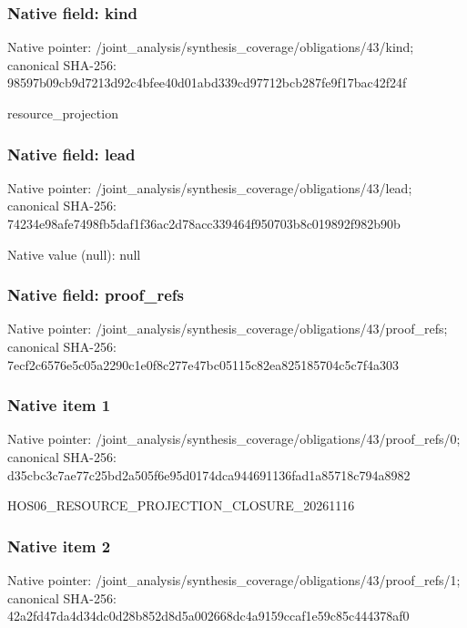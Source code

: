\documentclass[10pt,a4paper]{article}
\begin{document}
\subsubsection{Native field: kind}
Native pointer: /joint\_\allowbreak{}analysis/synthesis\_\allowbreak{}coverage/obligations/43/kind; canonical SHA-256: 98597b09cb9d7213d92c4bfee40d01abd339cd97712bcb287fe9f17bac42f24f

\begingroup\raggedright\sloppy resource\_\allowbreak{}projection\par\endgroup

\subsubsection{Native field: lead}
Native pointer: /joint\_\allowbreak{}analysis/synthesis\_\allowbreak{}coverage/obligations/43/lead; canonical SHA-256: 74234e98afe7498fb5daf1f36ac2d78acc339464f950703b8c019892f982b90b

Native value (null): null

\subsubsection{Native field: proof\_\allowbreak{}refs}
Native pointer: /joint\_\allowbreak{}analysis/synthesis\_\allowbreak{}coverage/obligations/43/proof\_\allowbreak{}refs; canonical SHA-256: 7ecf2c6576e5c05a2290c1e0f8c277e47bc05115c82ea825185704c5c7f4a303

\subsubsection{Native item 1}
Native pointer: /joint\_\allowbreak{}analysis/synthesis\_\allowbreak{}coverage/obligations/43/proof\_\allowbreak{}refs/0; canonical SHA-256: d35cbc3c7ae77c25bd2a505f6e95d0174dca944691136fad1a85718c794a8982

\begingroup\raggedright\sloppy HOS06\_\allowbreak{}RESOURCE\_\allowbreak{}PROJECTION\_\allowbreak{}CLOSURE\_\allowbreak{}20261116\par\endgroup

\subsubsection{Native item 2}
Native pointer: /joint\_\allowbreak{}analysis/synthesis\_\allowbreak{}coverage/obligations/43/proof\_\allowbreak{}refs/1; canonical SHA-256: 42a2fd47da4d34dc0d28b852d8d5a002668dc4a9159ccaf1e59c85c444378af0
\end{document}
